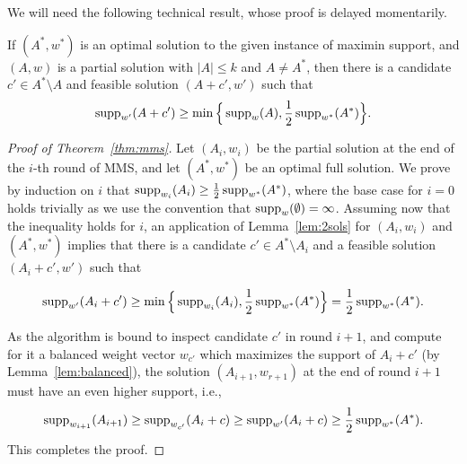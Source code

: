 We will need the following technical result, whose proof is delayed momentarily. 

\begin{lemma}\label{lem:2sols}
If $(A^*, w^*)$ is an optimal solution to the given instance of maximin support, and $(A,w)$ is a partial solution with $|A|\leq k$ and $A\neq A^*$, then there is a candidate $c'\in A^*\setminus A$ and feasible solution $(A+c', w')$ such that 
$$\operatorname{supp}_{w'}(A+c')\geq \min\Big\{\operatorname{supp}_w(A), \frac{1}{2} \operatorname{supp}_{w^*}(A^*)\Big\}.$$
\end{lemma}


\begin{proof}[Proof of Theorem~\ref{thm:mms}]
Let $(A_i, w_i)$ be the partial solution at the end of the $i$-th round of MMS, and let $(A^*, w^*)$ be an optimal full solution. We prove by induction on $i$ that $\operatorname{supp}_{w_i}(A_i)\geq \frac{1}{2}\operatorname{supp}_{w^*}(A^*)$, where the base case for $i=0$ holds trivially as we use the convention that $\operatorname{supp}_w(\emptyset)=\infty$.
Assuming now that the inequality holds for $i$, an application of Lemma~\ref{lem:2sols} for $(A_i, w_i)$ and $(A^*, w^*)$ implies that there is a candidate $c'\in A^*\setminus A_i$ and a feasible solution $(A_i+c', w')$ such that 

$$\operatorname{supp}_{w'}(A_i+c')\geq \min\Big\{\operatorname{supp}_{w_i}(A_i), \frac{1}{2} \operatorname{supp}_{w^*}(A^*)\Big\} = \frac{1}{2} \operatorname{supp}_{w^*}(A^*).$$

As the algorithm is bound to inspect candidate $c'$ in round $i+1$, and compute for it a balanced weight vector $w_{c'}$ which maximizes the support of $A_i+c'$ (by Lemma~\ref{lem:balanced}), the solution $(A_{i+1}, w_{r+1})$ at the end of round $i+1$ must have an even higher support, i.e., %
%
$$\operatorname{supp}_{w_{i+1}}(A_{i+1})\geq \operatorname{supp}_{w_{c'}}(A_i+c) 
\geq \operatorname{supp}_{w'}(A_i+c) \geq \frac{1}{2} \operatorname{supp}_{w^*}(A^*).$$
%
This completes the proof.
\end{proof}

